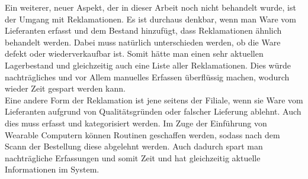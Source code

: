 Ein weiterer, neuer Aspekt, der in dieser Arbeit noch nicht behandelt wurde, ist der Umgang mit Reklamationen. Es ist durchaus denkbar, wenn man Ware vom Lieferanten erfasst und dem Bestand hinzufügt, dass Reklamationen ähnlich behandelt werden. Dabei muss natürlich unterschieden werden, ob die Ware defekt oder wiederverkaufbar ist. Somit hätte man einen sehr aktuellen Lagerbestand und gleichzeitig auch eine Liste aller Reklamationen. Dies würde nachträgliches und vor Allem manuelles Erfassen überflüssig machen, wodurch wieder Zeit gespart werden kann. \\

Eine andere Form der Reklamation ist jene seitens der Filiale, wenn sie Ware vom Lieferanten aufgrund von Qualitätsgründen oder falscher Lieferung ablehnt. Auch dies muss erfasst und kategorisiert werden. Im Zuge der Einführung von Wearable Computern können Routinen geschaffen werden, sodass nach dem Scann der Bestellung diese abgelehnt werden. Auch dadurch spart man nachträgliche Erfassungen und somit Zeit und hat gleichzeitig aktuelle Informationen im System. \\

